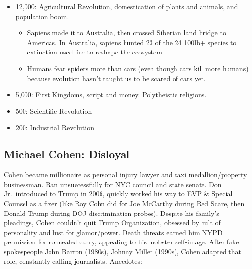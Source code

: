 \documentclass[
]{article}
\begin{document}
\begin{itemize}
  \begin{itemize}
  \item
    Sapiens lived in diverse groups of \textasciitilde100; not nuclear
    families (in Sudan today, Bari Indians believe more sperm creates
    better children so women have sex with as many men as possible).
    They migrated based on season, animal migration, and plant cycles
    (foraging was much more common than hunting).
  \item
    With a wholesome diet, relatively short week, low instance of
    disease, and exquisite knowledge of the environment, not a bad time
    to live. About 5\% died from violence, roughly the same as the 20th
    Century (1.5\% today for war/crime). Life expectancy (30-40) pulled
    down largely by infant deaths.
  \end{itemize}
\item
  12,000: Agricultural Revolution, domestication of plants and animals,
  and population boom.

  \begin{itemize}
  \item
    Sapiens made it to Australia, then crossed Siberian land bridge to
    Americas. In Australia, sapiens hunted 23 of the 24 100lb+ species
    to extinction used fire to reshape the ecosystem.
  \item
    Humans fear spiders more than cars (even though cars kill more
    humans) because evolution hasn't taught us to be scared of cars yet.
  \end{itemize}
\item
  5,000: First Kingdoms, script and money. Polytheistic religions.
\item
  500: Scientific Revolution
\item
  200: Industrial Revolution
\end{itemize}

\hypertarget{michael-cohen-disloyal}{%
\subsection{Michael Cohen: Disloyal}\label{michael-cohen-disloyal}}

Cohen became millionaire as personal injury lawyer and taxi
medallion/property businessman. Ran unsuccessfully for NYC council and
state senate. Don Jr.~introduced to Trump in 2006, quickly worked his
way to EVP \& Special Counsel as a fixer (like Roy Cohn did for Joe
McCarthy during Red Scare, then Donald Trump during DOJ discrimination
probes). Despite his family's pleadings, Cohen couldn't quit Trump
Organization, obsessed by cult of personality and lust for glamor/power.
Death threats earned him NYPD permission for concealed carry, appealing
to his mobster self-image. After fake spokespeople John Barron (1980s),
Johnny Miller (1990s), Cohen adapted that role, constantly calling
journalists. Anecdotes:
\end{document}
